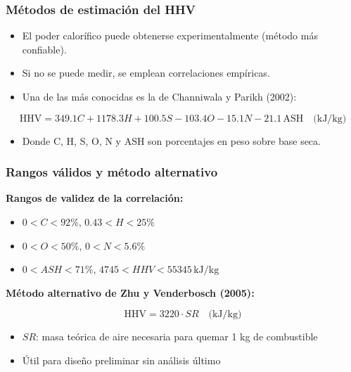 \documentclass[../../main.tex]{subfiles}
\begin{document}
\begin{frame}
\frametitle{Métodos de estimación del HHV}

\begin{itemize}
    \item El poder calorífico puede obtenerse experimentalmente (método más confiable).
    \item Si no se puede medir, se emplean correlaciones empíricas.
    \item Una de las más conocidas es la de Channiwala y Parikh (2002):
\end{itemize}

\[
\text{HHV} = 349.1C + 1178.3H + 100.5S - 103.4O - 15.1N - 21.1 \, \text{ASH} \quad \text{(kJ/kg)}
\]

\begin{itemize}
    \item Donde C, H, S, O, N y ASH son porcentajes en peso sobre base seca.
\end{itemize}

\end{frame}

\begin{frame}
\frametitle{Rangos válidos y método alternativo}

\textbf{Rangos de validez de la correlación:}

\begin{itemize}
    \item \(0 < C < 92\%\), \(0.43 < H < 25\%\)
    \item \(0 < O < 50\%\), \(0 < N < 5.6\%\)
    \item \(0 < ASH < 71\%\), \(4745 < HHV < 55345 \, \text{kJ/kg}\)
\end{itemize}

\vspace{0.3cm}
\textbf{Método alternativo de Zhu y Venderbosch (2005):}

\[
\text{HHV} = 3220 \cdot SR \quad \text{(kJ/kg)}
\]

\begin{itemize}
    \item \(SR\): masa teórica de aire necesaria para quemar 1 kg de combustible
    \item Útil para diseño preliminar sin análisis último
\end{itemize}

\end{frame}
\end{document}
